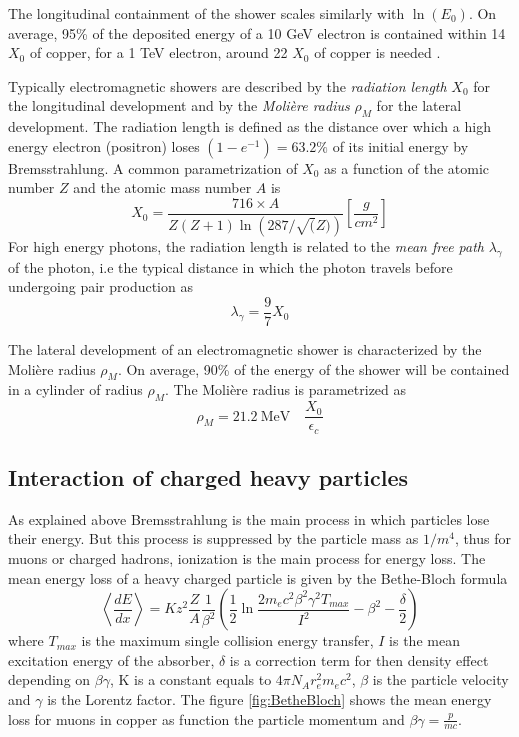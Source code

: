 The longitudinal containment of the shower scales similarly with $\ln\left(E_0\right)$. On average, 95\% of the deposited energy of a 10 GeV electron is contained within 14 $X_0$ of copper, for a 1 TeV electron, around 22 $X_0$ of copper is needed \cite{Wigmans:392793}.

Typically electromagnetic showers are described by the \textit{radiation length} $X_0$ for the longitudinal development and by the \textit{Moli\`ere radius} $\rho_{M}$ for the lateral development. The radiation length is defined as the distance over which a high energy electron (positron) loses $(1 - e^{-1}) = 63.2\%$ of its initial energy by Bremsstrahlung. A common parametrization of $X_0$ as a function of the atomic number $Z$ and the atomic mass number $A$ is \cite{Wigmans:392793}
\begin{equation}
  X_0 = \frac{716 \times A}{Z(Z+1)\ln\left(287/\sqrt(Z)\right)} [\frac{g}{cm^2}]
\end{equation}
For high energy photons, the radiation length is related to the \textit{mean free path} $\lambda_{\gamma}$ of the photon, i.e the typical distance in which the photon travels before undergoing pair production as
\begin{equation}
  \lambda_{\gamma} = \frac{9}{7} X_0
\end{equation}

The lateral development of an electromagnetic shower is characterized by the Moli\`ere radius $\rho_{M}$. On average, 90\% of the energy of the shower will be contained in a cylinder of radius $\rho_{M}$. The Moli\`ere radius is parametrized as \cite{Wigmans:392793}
\begin{equation}
  \rho_{M} = \SI{21.2}{\mega\eV} \quad \frac{X_0}{\epsilon_c}
\end{equation}

\subsection{Interaction of charged heavy particles}
\label{sec:InteracHeavyPart}

As explained above Bremsstrahlung is the main process in which particles lose their energy. But this process is suppressed by the particle mass as $1/m^4$, thus for muons or charged hadrons, ionization is the main process for energy loss. The mean energy loss of a heavy charged particle is given by the Bethe-Bloch formula \cite{Wigmans:392793}
\begin{equation}
  \left<\frac{dE}{dx}\right> = Kz^2\frac{Z}{A}\frac{1}{\beta^2}\left(\frac{1}{2}\ln\frac{2m_ec^2\beta^2\gamma^2T_{max}}{I^2} - \beta^2 - \frac{\delta}{2}\right)
\end{equation}
where $T_{max}$ is the maximum single collision energy transfer, $I$ is the mean excitation energy of the absorber, $\delta$ is a correction term for then density effect depending on $\beta\gamma$, K is a constant equals to $4\pi{}N_Ar_e^2m_ec^2$, $\beta$ is the particle velocity and $\gamma$ is the Lorentz factor. The figure \ref{fig:BetheBloch} shows the mean energy loss for muons in copper as function the particle momentum and $\beta\gamma = \frac{p}{mc}$.

